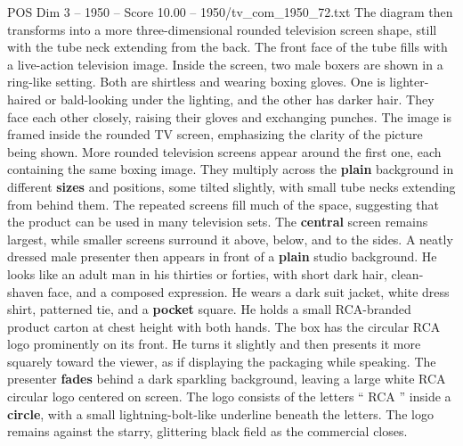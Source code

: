 \begin{textsample}{POS Dim 3 – 1950 – Score 10.00 – 1950/tv\_com\_1950\_72.txt}
The diagram then transforms into a more three-dimensional rounded television screen shape, still with the tube neck extending from the back.
The front face of the tube fills with a live-action television image.
Inside the screen, two male boxers are shown in a ring-like setting.
Both are shirtless and wearing boxing gloves.
One is lighter-haired or bald-looking under the lighting, and the other has darker hair.
They face each other closely, raising their gloves and exchanging punches.
The image is framed inside the rounded TV screen, emphasizing the clarity of the picture being shown.
More rounded television screens appear around the first one, each containing the same boxing image.
They multiply across the \textbf{plain} background in different \textbf{sizes} and positions, some tilted slightly, with small tube necks extending from behind them.
The repeated screens fill much of the space, suggesting that the product can be used in many television sets.
The \textbf{central} screen remains largest, while smaller screens surround it above, below, and to the sides.
A neatly dressed male presenter then appears in front of a \textbf{plain} studio background.
He looks like an adult man in his thirties or forties, with short dark hair, clean-shaven face, and a composed expression.
He wears a dark suit jacket, white dress shirt, patterned tie, and a \textbf{pocket} square.
He holds a small RCA-branded product carton at chest height with both hands.
The box has the circular RCA logo prominently on its front.
He turns it slightly and then presents it more squarely toward the viewer, as if displaying the packaging while speaking.
The presenter \textbf{fades} behind a dark sparkling background, leaving a large white RCA circular logo centered on screen.
The logo consists of the letters “ RCA ” inside a \textbf{circle}, with a small lightning-bolt-like underline beneath the letters.
The logo remains against the starry, glittering black field as the commercial closes.

\end{textsample}
